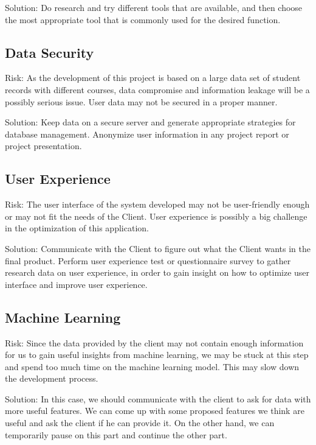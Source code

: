 \documentclass{article}
\begin{document}
\vspace{0.4cm}Solution: Do research and try different tools that are available, and then choose the most appropriate tool that is commonly used for the desired function.

\subsection{Data Security}
Risk: As the development of this project is based on a large data set of student records with different courses, data compromise and information leakage will be a possibly serious issue. User data may not be secured in a proper manner.

\vspace{0.4cm}Solution: Keep data on a secure server and generate appropriate strategies for database management. Anonymize user information in any project report or project presentation.

\subsection{User Experience}
Risk: The user interface of the system developed may not be user-friendly enough or may not fit the needs of the Client. User experience is possibly a big challenge in the optimization of this application.

\vspace{0.4cm}Solution: Communicate with the Client to figure out what the Client wants in the final product. Perform user experience test or questionnaire survey to gather research data on user experience, in order to gain insight on how to optimize user interface and improve user experience.

\subsection{Machine Learning}
Risk: Since the data provided by the client may not contain enough information for us to gain useful insights from machine learning, we may be stuck at this step and spend too much time on the machine learning model. This may slow down the development process.

\vspace{0.4cm}Solution: In this case, we should communicate with the client to ask for data with more useful features. We can come up with some proposed features we think are useful and ask the client if he can provide it. On the other hand, we can temporarily pause on this part and continue the other part. 
\end{document}
